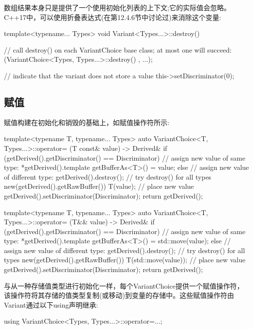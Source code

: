 数组结果本身只是提供了一个使用初始化列表的上下文;它的实际值会忽略。C++17中，可以使用折叠表达式(在第12.4.6节中讨论过)来消除这个变量:

\begin{cpp}
template<typename... Types>
void Variant<Types...>::destroy()
{
	// call destroy() on each VariantChoice base class; at most one will succeed:
	(VariantChoice<Types, Types...>::destroy() , ...);
	
	// indicate that the variant does not store a value
	this->setDiscriminator(0);
}
\end{cpp}


\subsection{赋值}

赋值构建在初始化和销毁的基础上，如赋值操作符所示:

\begin{cpp}
template<typename T, typename... Types>
auto VariantChoice<T, Types...>::operator= (T const& value) -> Derived& {
	if (getDerived().getDiscriminator() == Discriminator) {
		// assign new value of same type:
		*getDerived().template getBufferAs<T>() = value;
	}
	else {
		// assign new value of different type:
		getDerived().destroy(); // try destroy() for all types
		new(getDerived().getRawBuffer()) T(value); // place new value
		getDerived().setDiscriminator(Discriminator);
	}
	return getDerived();
}

template<typename T, typename... Types>
auto VariantChoice<T, Types...>::operator= (T&& value) -> Derived& {
	if (getDerived().getDiscriminator() == Discriminator) {
		// assign new value of same type:
		*getDerived().template getBufferAs<T>() = std::move(value);
	}
	else {
		// assign new value of different type:
		getDerived().destroy(); // try destroy() for all types
		new(getDerived().getRawBuffer()) T(std::move(value)); // place new value
		getDerived().setDiscriminator(Discriminator);
	}
	return getDerived();
}
\end{cpp}

与从一种存储值类型进行初始化一样，每个VariantChoice提供一个赋值操作符，该操作符将其存储的值类型复制(或移动)到变量的存储中。这些赋值操作符由Variant通过以下using声明继承:

\begin{cpp}
using VariantChoice<Types, Types...>::operator=...;
\end{cpp}

